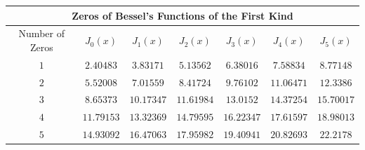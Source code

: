 \begin{table}[h]
	\begin{tabular}{|ccccccc|}
		\hline
		\multicolumn{7}{|c|}{Zeros of Bessel’s Functions of the First Kind} \\ \hline
		\multicolumn{1}{|c|}{Number of Zeros} & \multicolumn{1}{c|}{$J_{0}(x)$} & \multicolumn{1}{c|}{$J_{1}(x)$} & \multicolumn{1}{c|}{$J_{2}(x)$} & \multicolumn{1}{c|}{$J_{3}(x)$} & \multicolumn{1}{c|}{$J_{4}(x)$} & $J_{5}(x)$ \\ \hline
		\multicolumn{1}{|c|}{$1$} & \multicolumn{1}{c|}{$2.40483$} & \multicolumn{1}{c|}{$3.83171$} & \multicolumn{1}{c|}{$5.13562$} & \multicolumn{1}{c|}{$6.38016$} & \multicolumn{1}{c|}{$7.58834$} & $8.77148$ \\ \hline
		\multicolumn{1}{|c|}{$2$} & \multicolumn{1}{c|}{$5.52008$} & \multicolumn{1}{c|}{$7.01559$} & \multicolumn{1}{c|}{$8.41724$} & \multicolumn{1}{c|}{$9.76102$} & \multicolumn{1}{c|}{$11.06471$} & $12.3386$ \\ \hline
		\multicolumn{1}{|c|}{$3$} & \multicolumn{1}{c|}{$8.65373$} & \multicolumn{1}{c|}{$10.17347$} & \multicolumn{1}{c|}{$11.61984$} & \multicolumn{1}{c|}{$13.0152$} & \multicolumn{1}{c|}{$14.37254$} & $15.70017$ \\ \hline
		\multicolumn{1}{|c|}{$4$} & \multicolumn{1}{c|}{$11.79153$} & \multicolumn{1}{c|}{$13.32369$} & \multicolumn{1}{c|}{$14.79595$} & \multicolumn{1}{c|}{$16.22347$} & \multicolumn{1}{c|}{$17.61597$} & $18.98013$ \\ \hline
		\multicolumn{1}{|c|}{$5$} & \multicolumn{1}{c|}{$14.93092$} & \multicolumn{1}{c|}{$16.47063$} & \multicolumn{1}{c|}{$17.95982$} & \multicolumn{1}{c|}{$19.40941$} & \multicolumn{1}{c|}{$20.82693$} & $22.2178$ \\ \hline
	\end{tabular}
\end{table}
\bigskip

